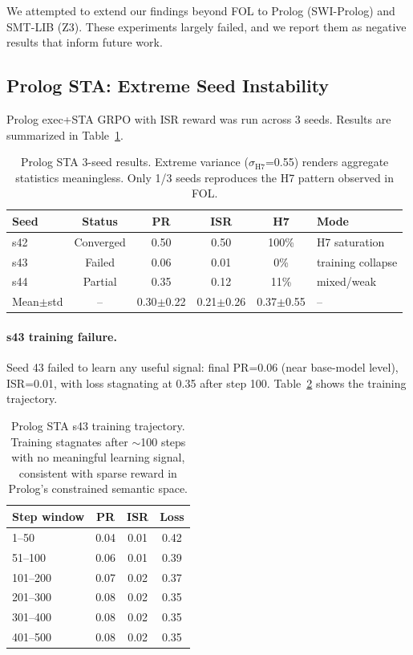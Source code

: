 \documentclass[11pt,a4paper]{article}
\newcommand{\ISR}{\textsc{ISR}}
\newcommand{\GRPO}{\textsc{GRPO}}
\begin{document}
We attempted to extend our findings beyond FOL to Prolog (SWI-Prolog) and SMT-LIB (Z3). These experiments largely failed, and we report them as negative results that inform future work.

\subsection{Prolog STA: Extreme Seed Instability}

Prolog exec+STA \GRPO{} with ISR reward was run across 3 seeds. Results are summarized in Table~\ref{tab:prolog_sta}.

\begin{table}[h]
\centering
\small
\begin{tabular}{lccccl}
\toprule
\textbf{Seed} & \textbf{Status} & \textbf{PR} & \textbf{\ISR{}} & \textbf{H7} & \textbf{Mode} \\
\midrule
s42 & Converged & 0.50 & 0.50 & 100\% & H7 saturation \\
s43 & Failed & 0.06 & 0.01 & 0\% & training collapse \\
s44 & Partial & 0.35 & 0.12 & 11\% & mixed/weak \\
\midrule
Mean$\pm$std & -- & 0.30$\pm$0.22 & 0.21$\pm$0.26 & 0.37$\pm$0.55 & -- \\
\bottomrule
\end{tabular}
\caption{Prolog STA 3-seed results. Extreme variance ($\sigma_{\text{H7}}$=0.55) renders aggregate statistics meaningless. Only 1/3 seeds reproduces the H7 pattern observed in FOL.}
\label{tab:prolog_sta}
\end{table}

\paragraph{s43 training failure.} Seed 43 failed to learn any useful signal: final PR=0.06 (near base-model level), ISR=0.01, with loss stagnating at 0.35 after step 100. Table~\ref{tab:prolog_s43_trajectory} shows the training trajectory.

\begin{table}[h]
\centering
\small
\begin{tabular}{lccc}
\toprule
\textbf{Step window} & \textbf{PR} & \textbf{\ISR{}} & \textbf{Loss} \\
\midrule
1--50 & 0.04 & 0.01 & 0.42 \\
51--100 & 0.06 & 0.01 & 0.39 \\
101--200 & 0.07 & 0.02 & 0.37 \\
201--300 & 0.08 & 0.02 & 0.35 \\
301--400 & 0.08 & 0.02 & 0.35 \\
401--500 & 0.08 & 0.02 & 0.35 \\
\bottomrule
\end{tabular}
\caption{Prolog STA s43 training trajectory. Training stagnates after $\sim$100 steps with no meaningful learning signal, consistent with sparse reward in Prolog's constrained semantic space.}
\label{tab:prolog_s43_trajectory}
\end{table}
\end{document}
